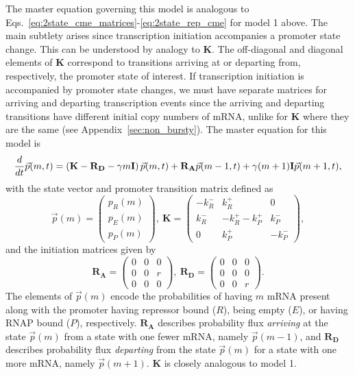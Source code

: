 The master equation governing this model is analogous
to Eqs.~\ref{eq:2state_cme_matrices}-\ref{eq:2state_rep_cme} for model 1 above. The
main subtlety arises since transcription initiation accompanies a promoter state
change. This can be understood by analogy to $\mathbf{K}$. The off-diagonal and
diagonal elements of $\mathbf{K}$ correspond to transitions arriving at or
departing from, respectively, the promoter state of interest. If transcription
initiation is accompanied by promoter state changes, we must have separate
matrices for arriving and departing transcription events since the arriving and
departing transitions have different initial copy numbers of mRNA, unlike for
$\mathbf{K}$ where they are the same (see Appendix~\ref{sec:non_bursty}). The
master equation for this model is
\begin{equation}
\frac{d {}}{d t}\vec{p}(m,t) =
\left( \mathbf{K} - \mathbf{R_D} - \gamma m \mathbf{I} \right) \vec{p}(m,t)
                + \mathbf{R_A} \vec{p}(m-1,t) +
                \gamma (m+1) \mathbf{I} \vec{p}(m+1,t),
\label{eq:3state_rep_cme}
\end{equation}
with the state vector and promoter transition matrix defined as
\begin{equation}
\vec{p}(m) = \begin{pmatrix} p_R(m) \\ p_E(m) \\ p_P(m) \end{pmatrix},\
\mathbf{K} = \begin{pmatrix} -k_R^- & k_R^+ & 0 \\
                        k_R^- & -k_R^+ -k_P^+ & k_P^- \\
                        0 & k_P^+ & -k_P^- 
                \end{pmatrix},
\label{eq:3state_cme_matrices_pt1}
\end{equation}
and the initiation matrices given by
\begin{equation}
\mathbf{R_A} = \begin{pmatrix}
                0 & 0 & 0 \\ 
                0 & 0 & r \\ 
                0 & 0 & 0
                \end{pmatrix},\
\mathbf{R_D} = \begin{pmatrix}
                0 & 0 & 0 \\ 
                0 & 0 & 0 \\ 
                0 & 0 & r
                \end{pmatrix}.
\label{eq:3state_cme_matrices_pt2}
\end{equation}
The elements of $\vec{p}(m)$ encode the probabilities of having $m$ mRNA present
along with the promoter having repressor bound ($R$), being empty ($E$), or
having RNAP bound ($P$), respectively. $\mathbf{R_A}$ describes probability flux
\textit{arriving} at the state $\vec{p}(m)$ from a state with one fewer mRNA,
namely $\vec{p}(m-1)$, and $\mathbf{R_D}$ describes probability flux
\textit{departing} from the state $\vec{p}(m)$ for a state with one more mRNA,
namely $\vec{p}(m+1)$. $\mathbf{K}$ is closely analogous to model 1.

